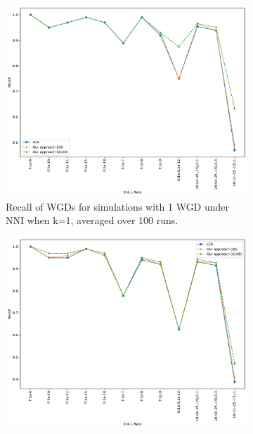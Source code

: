 \documentclass[10pt]{article}
\begin{document}
\begin{figure}[h!]
    \centering
    \begin{subfigure}[b]{0.31\textwidth}
        \centering
        \includegraphics[width=\textwidth]{figs/recall-NNI-K1-WGD-t20-t80-Avg.pdf}
        \caption{Recall of WGDs for simulations with 1 WGD under NNI when k=1, averaged over 100 runs.}
        \label{fig:recall-NNI-k1-wgd}
    \end{subfigure}
    \hfill
    \begin{subfigure}[b]{0.31\textwidth}
        \centering
        \includegraphics[width=\textwidth]{figs/recall-NNI-K5-WGD-t20-t80-Avg.pdf}

\end{subfigure}
\end{figure}
\end{document}
